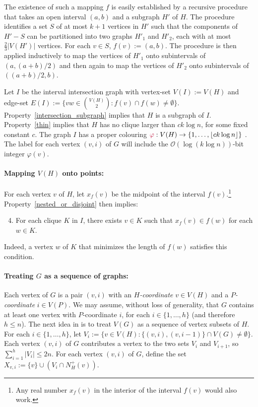 \documentclass{patmorin}
\makeatletter
\renewcommand{\le}{\leqslant}
\newcommand{\defin}[1]{\emph{\textcolor{brightmaroon}{#1}}}
\def\mathcolor#1#{\@mathcolor{#1}}
\def\@mathcolor#1#2#3{%
  \protect\leavevmode
  \begingroup
    \color#1{#2}#3%
  \endgroup
}
\newcommand{\mathdefin}[1]{\mathcolor{brightmaroon}{#1}}
\newcommand{\Oh}{\calO}
\newcommand{\calO}{\mathcal{O}}
\makeatother
\begin{document}
  The existence of such a mapping $f$ is easily established by a recursive procedure that takes an open interval $(a,b)$ and a subgraph $H'$ of $H$.
  The procedure identifies a set $S$ of at most $k+1$ vertices in $H'$ such that the components of $H'-S$ can be partitioned into two graphs $H'_1$ and $H'_2$, each with at most $\tfrac{2}{3}|V(H')|$ vertices.
  For each $v\in S$, $f(v):=(a,b)$.  The procedure is then applied inductively to map the vertices of $H'_1$ onto subintervals of $(a,(a+b)/2)$ and then again to map the vertices of $H'_2$ onto subintervals of $((a+b)/2,b)$.

  Let $I$ be the interval intersection graph with vertex-set $V(I):=V(H)$ and edge-set $E(I):=\{vw\in\binom{V(H)}{2}:f(v)\cap f(w)\neq\emptyset\}$.
  Property~\ref{intersection_subgraph} implies that $H$ is a subgraph of $I$. Property~\ref{thin} implies that $H$ has no clique larger than $ck\log n$, for some fixed constant $c$.
  The graph $I$ has a proper colouring $\mathdefin{\varphi}:V(H)\to\{1,\ldots,\lfloor ck\log n\rfloor\}$ \cite{gilmore.hoffman:characterization}.
  The label for each vertex $(v,i)$ of $G$ will include the $\Oh(\log (k\log n))$-bit integer $\varphi(v)$.

  \paragraph{\boldmath Mapping $V(H)$ onto points:}
  For each vertex $v$ of $H$, let $x_f(v)$ be the midpoint of the interval $f(v)$.\footnote{Any real number $x_f(v)$ in the interior of the interval $f(v)$ would also work.}  Property~\ref{nested_or_disjoint} then implies:
  \begin{enumerate}[nosep,label=(I\arabic*)]\setcounter{enumi}{3}
      \item\label{clique_property} For each clique $K$ in $I$, there exists $v\in K$ such that $x_f(v)\in f(w)$ for each $w\in K$.
  \end{enumerate}
  Indeed, a vertex $w$ of $K$ that minimizes the length of $f(w)$ satisfies this condition.

  \paragraph{\boldmath Treating $G$ as a sequence of graphs:}
  Each vertex of $G$ is a pair $(v,i)$ with an \defin{$H$-coordinate} $v\in V(H)$ and a \defin{$P$-coordinate} $i\in V(P)$.
  We may assume, without loss of generality, that $G$ contains at least one vertex with $P$-coordinate $i$, for each $i\in\{1,\ldots,h\}$ (and therefore $h\le n$).
  The next idea in \cite{dujmovic.esperet.ea:adjacency} is to treat $V(G)$ as a sequence of vertex subsets of $H$.
  For each $i\in\{1,\ldots,h\}$, let $V_i:=\{v\in V(H): \{(v,i),(v,i-1)\}\cap V(G)\neq\emptyset \}$.    Each vertex $(v,i)$ of $G$ contributes a vertex to the two sets $V_{i}$ and $V_{i+1}$, so $\sum_{i=1}^h |V_i|\le 2n$.  For each vertex $(v,i)$ of $G$, define the set $X_{v,i}:= \{v\}\cup (V_i\cap N^+_H(v))$.
\end{document}
